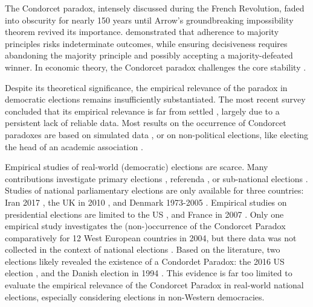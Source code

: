 \documentclass[12pt]{scrartcl}
\begin{document}
The Condorcet paradox, intensely discussed during the French Revolution, faded into obscurity for nearly 150 years \citep[][p.~99]{Rothschild2005, McLean2019} until Arrow’s groundbreaking impossibility theorem revived its importance.  \citet{Arrow1950} demonstrated that adherence to majority principles risks indeterminate outcomes, while ensuring decisiveness requires abandoning the majority principle and possibly accepting a majority-defeated winner. In economic theory, the Condorcet paradox challenges the core stability \citep{Moulin2014}.

Despite its theoretical significance, the empirical relevance of the paradox in democratic elections remains insufficiently substantiated. The most recent survey concluded that its empirical relevance is far from settled \citep{VanDeemen2013}, largely due to a persistent lack of reliable data. Most results on the occurrence of Condorcet paradoxes are based on simulated data \citep{Lepelley2001, Gehrlein2006, Sauermann2022}, or on non-political elections, like electing the head of an academic association \citep{Chamberlin1984, Feld1992, Regenwetter2007, Tideman2009, Popov2014}.

Empirical studies of real-world (democratic) elections are scarce. Many contributions investigate primary elections \citep{Kurrild2018}, referenda \citep{Bochsler2010, Justesen2007},  or sub-national elections \citep{Munkoe2014, Darmann2023}.  Studies of national parliamentary elections are only available for three countries: Iran 2017 \citep{Feizi2020}, the UK in 2010 \citep{Abramson2013}, and Denmark  1973-2005 \citep{vanDeemen1998, KurrildKlitgaard2001, KurrildKlitgaard2008}. Empirical studies on presidential elections are limited to the US  \citep{Riker1988, Abramson1995, Potthoff2021}, and France in 2007 \citep{Abramson2007}. Only one empirical study investigates the (non-)occurrence of the Condorcet Paradox comparatively for 12 West European countries in 2004,  but there  data was not collected in the context of national elections \citep{McDonald2012}. Based on the literature, two elections likely revealed the existence of a Condordet Paradox: the 2016 US election \citep{Potthoff2021}, and the Danish election in 1994 \citep{KurrildKlitgaard2008}.  This  evidence is far too limited to evaluate the empirical relevance of the Condorcet Paradox in real-world national elections,  especially considering elections in non-Western democracies.  
\end{document}
